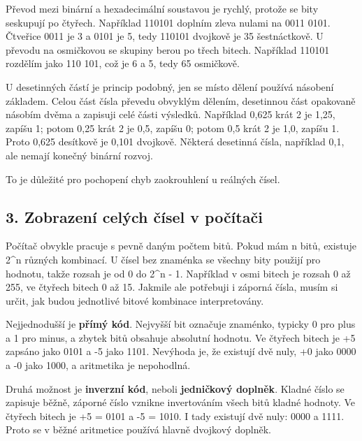 Převod mezi binární a hexadecimální soustavou je rychlý, protože se bity seskupují po čtyřech. Například 110101 doplním zleva nulami na 0011 0101. Čtveřice 0011 je 3 a 0101 je 5, tedy 110101 dvojkově je 35 šestnáctkově. U převodu na osmičkovou se skupiny berou po třech bitech. Například 110101 rozdělím jako 110 101, což je 6 a 5, tedy 65 osmičkově.


U desetinných částí je princip podobný, jen se místo dělení používá násobení základem. Celou část čísla převedu obvyklým dělením, desetinnou část opakovaně násobím dvěma a zapisuji celé části výsledků. Například 0,625 krát 2 je 1,25, zapíšu 1; potom 0,25 krát 2 je 0,5, zapíšu 0; potom 0,5 krát 2 je 1,0, zapíšu 1. Proto 0,625 desítkově je 0,101 dvojkově. Některá desetinná čísla, například 0,1, ale nemají konečný binární rozvoj.

To je důležité pro pochopení chyb zaokrouhlení u reálných čísel.

\subsection*{3. Zobrazení celých čísel v počítači}

Počítač obvykle pracuje s pevně daným počtem bitů. Pokud mám n bitů, existuje 2\textasciicircum{}n různých kombinací. U čísel bez znaménka se všechny bity použijí pro hodnotu, takže rozsah je od 0 do 2\textasciicircum{}n - 1. Například v osmi bitech je rozsah 0 až 255, ve čtyřech bitech 0 až 15. Jakmile ale potřebuji i záporná čísla, musím si určit, jak budou jednotlivé bitové kombinace interpretovány.

Nejjednodušší je \textbf{přímý kód}. Nejvyšší bit označuje znaménko, typicky 0 pro plus a 1 pro minus, a zbytek bitů obsahuje absolutní hodnotu. Ve čtyřech bitech je +5 zapsáno jako 0101 a -5 jako 1101. Nevýhoda je, že existují dvě nuly, +0 jako 0000 a -0 jako 1000, a aritmetika je nepohodlná.

Druhá možnost je \textbf{inverzní kód}, neboli \textbf{jedničkový doplněk}. Kladné číslo se zapisuje běžně, záporné číslo vznikne invertováním všech bitů kladné hodnoty. Ve čtyřech bitech je +5 = 0101 a -5 = 1010. I tady existují dvě nuly: 0000 a 1111. Proto se v běžné aritmetice používá hlavně dvojkový doplněk.

